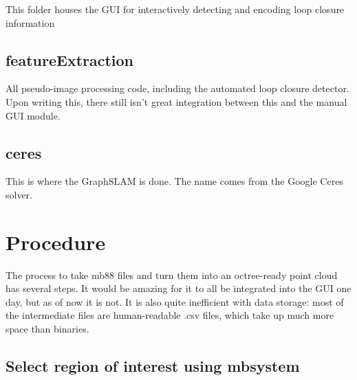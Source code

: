 \documentclass[12pt]{amsart}
\begin{document}
This folder houses the GUI for interactively detecting and encoding loop closure information 

\subsection{featureExtraction}

All pseudo-image processing code, including the automated loop closure detector. Upon writing this, there still isn't great integration between this and the manual GUI module.

\subsection{ceres}

This is where the GraphSLAM is done. The name comes from the Google Ceres solver.



\section{Procedure}

The process to take mb88 files and turn them into an octree-ready point cloud has several steps. It would be amazing for it to all be integrated into the GUI one day, but as of now it is not. It is also quite inefficient with data storage: most of the intermediate files are human-readable .csv files, which take up much more space than binaries.

\subsection{Select region of interest using mbsystem}
\end{document}
